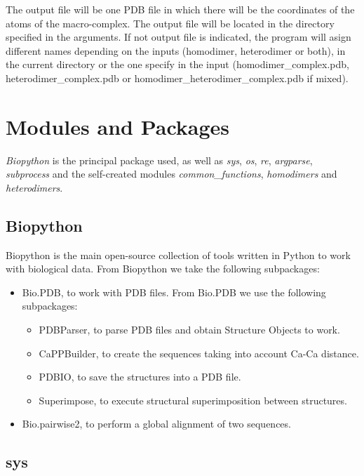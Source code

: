\documentclass[a4paper,10pt]{report}
\begin{document}
The output file will be one PDB file in which there will be the coordinates of the atoms of the macro-complex. The output file will be located in the directory specified in the arguments. 
If not output file is indicated, the program will asign different names depending on the inputs (homodimer, heterodimer or both), in the current directory or the one specify in the input (homodimer\_complex.pdb, heterodimer\_complex.pdb or homodimer\_heterodimer\_complex.pdb if mixed).


\section{Modules and Packages}

\textit{Biopython} is the principal package used, as well as \textit{sys}, \textit{os}, \textit{re}, \textit{argparse}, \textit{subprocess} and the self-created modules \textit{common\_functions}, \textit{homodimers} and \textit{heterodimers}. 

\subsection{Biopython}

Biopython is the main open-source collection of tools written in Python to work with biological data. From Biopython we take the following subpackages:

\begin{itemize}
 \item Bio.PDB, to work with PDB files. From Bio.PDB we use the following subpackages:
 \begin{itemize}
  \item PDBParser, to parse PDB files and obtain Structure Objects to work.
  \item CaPPBuilder, to create the sequences taking into account Ca-Ca distance.
  \item PDBIO, to save the structures into a PDB file.
  \item Superimpose, to execute structural superimposition between structures.
 \end{itemize}
 \item Bio.pairwise2, to perform a global alignment of two sequences.
\end{itemize}


\subsection{sys}
\end{document}
